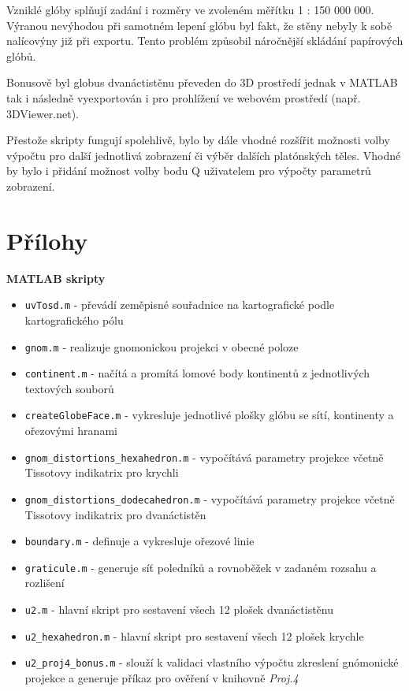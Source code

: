 \documentclass[12pt, a4paper]{article}
\begin{document}
Vzniklé glóby splňují zadání i rozměry ve zvoleném měřítku 1 : 150 000 000. Výranou nevýhodou při samotném lepení glóbu byl fakt, že stěny nebyly k sobě nalícovýny již při exportu. Tento problém způsobil náročnější skládání papírových glóbů.

Bonusově byl globus dvanáctistěnu převeden do 3D prostředí jednak v MATLAB tak i následně vyexportován i pro prohlížení ve webovém prostředí (např. 3DViewer.net).

Přestože skripty fungují spolehlivě, bylo by dále vhodné rozšířit možnosti volby výpočtu pro další jednotlivá zobrazení či výběr dalších platónských těles. Vhodné by bylo i přidání možnost volby bodu Q uživatelem pro výpočty parametrů zobrazení.

\section{Přílohy}

\textbf{MATLAB skripty}

\begin{itemize}
    \item \texttt{uvTosd.m} - převádí zeměpisné souřadnice na kartografické podle kartografického pólu
    
    \item \texttt{gnom.m} - realizuje gnomonickou projekci v obecné poloze
    
    \item \texttt{continent.m} - načítá a promítá lomové body kontinentů z jednotlivých textových souborů
    
    \item \texttt{createGlobeFace.m} - vykresluje jednotlivé plošky glóbu se sítí, kontinenty a ořezovými hranami
    
    \item \texttt{gnom\_distortions\_hexahedron.m} - vypočítává parametry projekce včetně Tissotovy indikatrix pro krychli
    
    \item \texttt{gnom\_distortions\_dodecahedron.m} - vypočítává parametry projekce včetně Tissotovy indikatrix pro dvanáctistěn
    
    \item \texttt{boundary.m} - definuje a vykresluje ořezové linie
    
    
    \item \texttt{graticule.m} - generuje síť poledníků a rovnoběžek v zadaném rozsahu a rozlišení
    
    \item \texttt{u2.m} - hlavní skript pro sestavení všech 12 plošek dvanáctistěnu
    
    \item \texttt{u2\_hexahedron.m} - hlavní skript pro sestavení všech 12 plošek krychle

    \item \texttt{u2\_proj4\_bonus.m} - slouží k validaci vlastního výpočtu zkreslení gnómonické projekce a generuje příkaz pro ověření v knihovně \textit{Proj.4}
    
\end{itemize}
\end{document}
